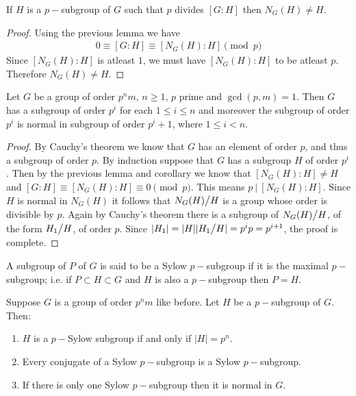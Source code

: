 \begin{corollary}
  If $H$ is a $p-$subgroup of $G$ such that $p$ divides $[G:H]$ then $N_G(H) \neq H$.
\end{corollary}
\begin{proof}
  Using the previous lemma we have
  \begin{align*}
    0 \equiv [G:H] \equiv [N_G(H): H] \pmod{p}
  \end{align*}
  Since $[N_G(H):H]$ is atleast $1$, we must have $[N_G(H):H]$ to be atleast $p$. Therefore $N_G(H) \neq H$.
\end{proof}
\begin{theorem}
  Let $G$ be a group of order $p^nm$, $n\geq 1$, $p$ prime and $\gcd(p,m) = 1$. Then $G$ has a subgroup of order $p^i$ for each $1\leq i \leq n$ and moreover the subgroup of order $p^i$ is normal in subgroup of order $p^i+1$, where $1\leq i < n$.
\end{theorem}
\begin{proof}
  By Cauchy's theorem we know that $G$ has an element of order $p$, and thus a subgroup of order $p$. By induction suppose that $G$ has a subgroup $H$ of order $p^i$. Then by the previous lemma and corollary we know that $[N_G(H): H] \neq H$ and $[G:H] \equiv [N_G(H): H] \equiv 0 \pmod{p}$. This means $p\ |\ [N_G(H):H]$. Since $H$ is normal in $N_G(H)$ it follows that $N_G(H) \bign/ H$ is a group whose order is divisible by $p$. Again by Cauchy's theorem there is a subgroup of $N_G(H)\bign/H$, of the form $H_1\bign/H$, of order $p$. Since $|H_1| = |H| |H_1\bign/H| = p^{i}p = p^{i+1}$, the proof is complete.
\end{proof}
\begin{definition}
  A subgroup of $P$ of $G$ is said to be a Sylow $p-$subgroup if it is the maximal $p-$subgroup; i.e. if $P\subset H \subset G$ and $H$ is also a $p-$subgroup then $P=H$.
\end{definition}
\begin{corollary}
  Suppose $G$ is a group of order $p^n m$ like before. Let $H$ be a $p-$subgroup of $G$. Then:
  \begin{enumerate}
    \item $H$ is a $p-$Sylow subgroup if and only if $|H| = p^n$.
    \item Every conjugate of a Sylow $p-$subgroup is a Sylow $p-$subgroup.
    \item If there is only one Sylow $p-$subgroup then it is normal in $G$.
  \end{enumerate}
\end{corollary}

